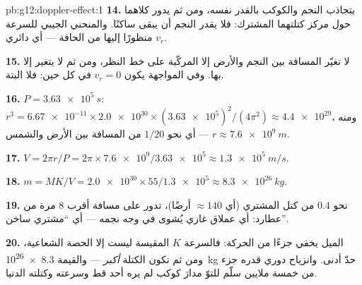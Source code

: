\begin{solution}{pb:g12:doppler-effect:1}
\textbf{14.} يتجاذب النجم والكوكب بالقدر نفسه، ومن ثم يدور كلاهما حول مركز
كتلتهما المشترك: فلا يقدر النجم أن يبقى ساكنًا. والمنحني الجيبي للسرعة $v_r$  منظورًا إليها من الحافة --- أي  دائري.

\textbf{15.} لا تغيّر المسافة بين النجم والأرض إلا المركّبة على خط النظر، ومن ثم
لا يتغير  إلا بها. وفي المواجهة يكون $v_r = 0$ في كل حين: فلا  البتة.

\textbf{16.} $P = \qty{3.63e5}{s}$: $r^3 = \num{6.67e-11} \times \num{2.0e30} \times
(\num{3.63e5})^2/(4\pi^2) \approx \num{4.4e29}$، ومنه $r \approx \qty{7.6e9}{m}$ ---
أي نحو $1/20$ من المسافة بين الأرض والشمس.

\textbf{17.} $V = 2\pi r/P = 2\pi \times \num{7.6e9}/\num{3.63e5} \approx
\qty{1.3e5}{m/s}$.

\textbf{18.} $m = M K/V = \num{2.0e30} \times 55/\num{1.3e5} \approx \qty{8.3e26}{kg}$.

\textbf{19.} نحو $0.4$ من كتل المشتري (أي $\approx 140$ أرضًا)، تدور على مسافة أقرب $8$
مرة من عطارد: أي عملاق غازي يُشوى في وجه نجمه --- أي ``مشتري ساخن''.

\textbf{20.} الميل يخفي جزءًا من الحركة: فالسرعة $K$ المقيسة ليست إلا الحصة
الشعاعية، ومن ثم تكون الكتلة  \emph{أكبر} --- والقيمة \qty{8.3e26}{kg} حدّ أدنى. وانزياح دوري
قدره جزء من خمسة ملايين سلّم للتوّ مدارَ كوكب لم يره أحد قط وسرعته وكتلته الدنيا.
\end{solution}
